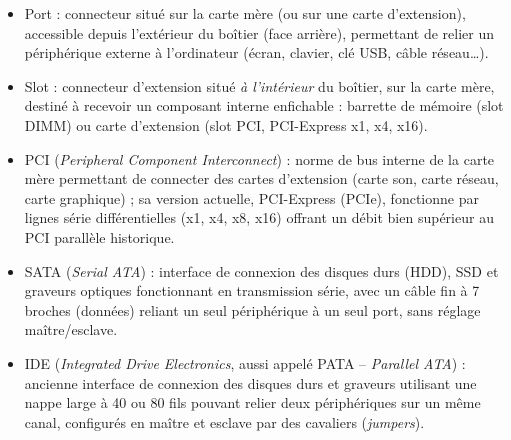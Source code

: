 \documentclass[11pt]{article}
\newcommand{\cle}[1]{{\popxbold\color{popdark}#1}}
\begin{document}
\begin{corrige}
\begin{itemize}
  \item \cle{Port} : connecteur situé sur la carte mère (ou sur une carte d'extension), accessible depuis l'extérieur du boîtier (face arrière), permettant de relier un périphérique externe à l'ordinateur (écran, clavier, clé USB, câble réseau\ldots).
  \item \cle{Slot} : connecteur d'extension situé \emph{à l'intérieur} du boîtier, sur la carte mère, destiné à recevoir un composant interne enfichable : barrette de mémoire (slot DIMM) ou carte d'extension (slot PCI, PCI-Express x1, x4, x16).
  \item \cle{PCI} (\emph{Peripheral Component Interconnect}) : norme de bus interne de la carte mère permettant de connecter des cartes d'extension (carte son, carte réseau, carte graphique) ; sa version actuelle, \cle{PCI-Express} (PCIe), fonctionne par lignes série différentielles (x1, x4, x8, x16) offrant un débit bien supérieur au PCI parallèle historique.
  \item \cle{SATA} (\emph{Serial ATA}) : interface de connexion des disques durs (HDD), SSD et graveurs optiques fonctionnant en transmission série, avec un câble fin à 7 broches (données) reliant un seul périphérique à un seul port, sans réglage maître/esclave.
  \item \cle{IDE} (\emph{Integrated Drive Electronics}, aussi appelé PATA -- \emph{Parallel ATA}) : ancienne interface de connexion des disques durs et graveurs utilisant une nappe large à 40 ou 80 fils pouvant relier deux périphériques sur un même canal, configurés en maître et esclave par des cavaliers (\emph{jumpers}).
\end{itemize}
\end{corrige}
\end{document}
